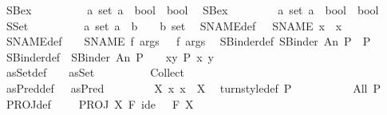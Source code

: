 \begin{isabellebody}
\ \ SBex\ \ \ \ \ \ \ \ \ {\isacharcolon}{\isacharcolon}\ {\isachardoublequoteopen}{\isacharbrackleft}{\isacharprime}a\ set{\isacharcomma}\ {\isacharprime}a\ {\isacharequal}{\isachargreater}\ bool{\isacharbrackright}\ {\isacharequal}{\isachargreater}\ bool{\isachardoublequoteclose}\isanewline
\ \ SBex{}\ \ \ \ \ \ \ \ {\isacharcolon}{\isacharcolon}\ {\isachardoublequoteopen}{\isacharbrackleft}{\isacharprime}a\ set{\isacharcomma}\ {\isacharprime}a\ {\isacharequal}{\isachargreater}\ bool{\isacharbrackright}\ {\isacharequal}{\isachargreater}\ bool{\isachardoublequoteclose}\isanewline
\ \ SSet\ \ \ \ \ \ \ \ \ {\isacharcolon}{\isacharcolon}\ {\isachardoublequoteopen}{\isacharbrackleft}{\isacharprime}a\ set{\isacharcomma}\ {\isacharprime}a\ {\isacharequal}{\isachargreater}\ {\isacharprime}b{\isacharbrackright}\ \ \ {\isacharequal}{\isachargreater}\ {\isacharprime}b\ set{\isachardoublequoteclose}\isanewline
\isanewline
\isanewline
\isanewline
{}\isamarkupfalse%
\isanewline
\ \ SNAME{}{\isacharunderscore}def{\isacharcolon}\ \ \ {\isachardoublequoteopen}SNAME{}\ x\ {\isacharequal}{\isacharequal}\ x{\isachardoublequoteclose}\isanewline
\ \ SNAME{\isacharunderscore}def{\isacharcolon}\ \ \ \ {\isachardoublequoteopen}SNAME\ f\ args\ \ {\isacharequal}{\isacharequal}\ f\ args{\isachardoublequoteclose}\isanewline
\ \ SBinder{}{\isacharunderscore}def{\isacharcolon}\ {\isachardoublequoteopen}SBinder{}\ An\ P\ {\isacharequal}{\isacharequal}\ P{\isachardoublequoteclose}\isanewline
\ \ SBinder{\isacharunderscore}def{\isacharcolon}\ \ {\isachardoublequoteopen}SBinder\ An\ P\ \ {\isacharequal}{\isacharequal}\ {\isacharparenleft}{\isacharpercent}\ {\isacharparenleft}x{\isacharcomma}y{\isacharparenright}{\isachardot}\ {\isacharparenleft}P\ x\ y{\isacharparenright}{\isacharparenright}{\isachardoublequoteclose}\isanewline
\ \ asSet{\isacharunderscore}def{\isacharcolon}\ \ \ \ {\isachardoublequoteopen}asSet\ \ \ \ \ \ \ \ \ {\isacharequal}{\isacharequal}\ Collect{\isachardoublequoteclose}\isanewline
\ \ asPred{\isacharunderscore}def{\isacharcolon}\ \ \ {\isachardoublequoteopen}asPred\ \ \ \ \ \ \ \ {\isacharequal}{\isacharequal}\ {\isacharparenleft}{\isacharpercent}X{\isachardot}\ {\isacharpercent}x{\isachardot}\ x\ {\isacharcolon}\ X{\isacharparenright}{\isachardoublequoteclose}\isanewline
\ \ turnstyle{\isacharunderscore}def{\isacharcolon}{\isachardoublequoteopen}{\isacharbar}{\isacharminus}\ P\ \ \ \ \ \ \ \ \ \ {\isacharequal}{\isacharequal}\ All\ P{\isachardoublequoteclose}\ \isanewline
\ \ PROJ{\isacharunderscore}def{\isacharcolon}\ \ \ \ \ {\isachardoublequoteopen}PROJ\ X\ F\ ide\ \ {\isacharequal}{\isacharequal}\ F\ X{\isachardoublequoteclose}\ \isanewline

\end{isabellebody}
